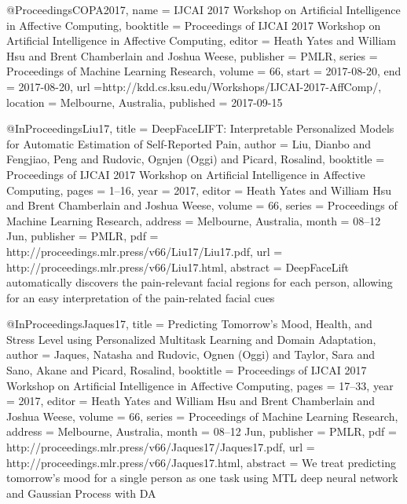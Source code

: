 
@Proceedings{COPA2017,
  name = {IJCAI 2017 Workshop on Artificial Intelligence in Affective Computing},
  booktitle = {Proceedings of IJCAI 2017 Workshop on Artificial Intelligence in Affective Computing},
  editor =    {Heath Yates and William Hsu and Brent Chamberlain and Joshua Weese},
  publisher = {PMLR},
  series =    {Proceedings of Machine Learning Research},
  volume =    66,
  start = {2017-08-20},
  end = {2017-08-20},
  url ={http://kdd.cs.ksu.edu/Workshops/IJCAI-2017-AffComp/},
  location = {Melbourne, Australia},
  published = {2017-09-15}
}


@InProceedings{Liu17,
  title = {DeepFaceLIFT: Interpretable Personalized Models for Automatic Estimation of Self-Reported Pain},
  author = {Liu, Dianbo and Fengjiao, Peng and Rudovic, Ognjen (Oggi) and Picard, Rosalind},
  booktitle = {Proceedings of IJCAI 2017 Workshop on Artificial Intelligence in Affective Computing},
  pages = 	 {1--16},
  year = 	 {2017},
  editor =    {Heath Yates and William Hsu and Brent Chamberlain and Joshua Weese},
  volume = 	 {66},
  series = 	 {Proceedings of Machine Learning Research},
  address =  {Melbourne, Australia},
  month = 	 {08--12 Jun},
  publisher = {PMLR},
  pdf = 	 {http://proceedings.mlr.press/v66/Liu17/Liu17.pdf},
  url = 	 {http://proceedings.mlr.press/v66/Liu17.html},
  abstract = {DeepFaceLift automatically discovers the pain-relevant facial regions for each person, allowing for an easy interpretation of the pain-related facial cues}
}


@InProceedings{Jaques17,
  title = {Predicting Tomorrow's Mood, Health, and Stress Level using Personalized Multitask Learning and Domain Adaptation},
  author = {Jaques, Natasha and Rudovic, Ognen (Oggi) and Taylor, Sara and Sano, Akane and Picard, Rosalind},
  booktitle = {Proceedings of IJCAI 2017 Workshop on Artificial Intelligence in Affective Computing},
  pages = 	 {17--33},
  year = 	 {2017},
  editor =    {Heath Yates and William Hsu and Brent Chamberlain and Joshua Weese},
  volume = 	 {66},
  series = 	 {Proceedings of Machine Learning Research},
  address =  {Melbourne, Australia},
  month = 	 {08--12 Jun},
  publisher = {PMLR},
  pdf = 	 {http://proceedings.mlr.press/v66/Jaques17/Jaques17.pdf},
  url = 	 {http://proceedings.mlr.press/v66/Jaques17.html},
  abstract = {We treat predicting tomorrow's mood for a single person as one task using MTL deep neural network and Gaussian Process with DA}
}

